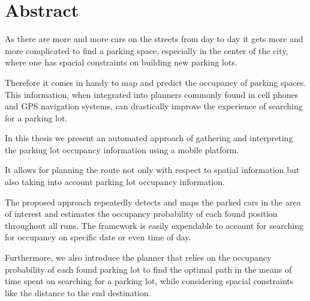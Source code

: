 \chapter{Abstract}
\label{cha:abstract}

As there are more and more cars on the streets from day to day it gets more and
more complicated to find a parking space, especially in the center of the city,
where one has spacial constraints on building new parking lots.

Therefore it comes in handy to map and predict the occupancy of parking spaces.
This information, when integrated into planners commonly found in cell phones
and GPS navigation systems, can drastically improve the experience of searching
for a parking lot.

In this thesis we present an automated approach of gathering and interpreting
the parking lot occupancy information using a mobile platform.

It allows for planning the route not only
with respect to spatial information but also taking into account parking lot
occupancy information.

The proposed approach repeatedly detects and maps the parked cars in the area of interest
and estimates the occupancy probability of each found position throughout all runs. The framework
is easily expendable to account for searching for occupancy on specific date or
even time of day.

Furthermore, we also introduce the planner that relies on the occupancy
probability of each found parking lot to find the optimal path in the means of time spent on
searching for a parking lot, while considering spacial constraints like the
distance to the end destination.



